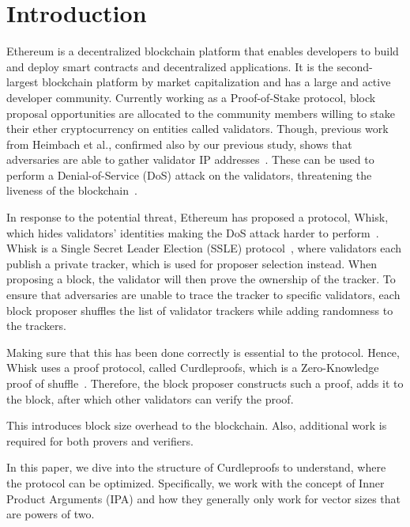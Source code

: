 

\section{Introduction}\label{sec:introduction}
Ethereum is a decentralized blockchain platform that enables developers to build and deploy smart contracts and decentralized applications.
It is the second-largest blockchain platform by market capitalization and has a large and active developer community.
Currently working as a Proof-of-Stake protocol, block proposal opportunities are allocated to the community members willing to stake their ether cryptocurrency on entities called validators.
Though, previous work from Heimbach et al., confirmed also by our previous study, shows that adversaries are able to gather validator IP addresses~\cite{heimbach2024deanonymizingethereumvalidatorsp2p,ouroldpaper}.
These can be used to perform a Denial-of-Service (DoS) attack on the validators, threatening the liveness of the blockchain~\cite{EthereumAttackDefense2024,ouroldpaper}.

In response to the potential threat, Ethereum has proposed a protocol, Whisk, which hides validators' identities making the DoS attack harder to perform~\cite{Whisk2024}.
Whisk is a Single Secret Leader Election (SSLE) protocol~\cite{10.1145/3419614.3423258}, where validators each publish a private tracker, which is used for proposer selection instead.
When proposing a block, the validator will then prove the ownership of the tracker.
To ensure that adversaries are unable to trace the tracker to specific validators, each block proposer shuffles the list of validator trackers while adding randomness to the trackers.

Making sure that this has been done correctly is essential to the protocol.
Hence, Whisk uses a proof protocol, called Curdleproofs, which is a Zero-Knowledge proof of shuffle~\cite{Curdleproofs}.
Therefore, the block proposer constructs such a proof, adds it to the block, after which other validators can verify the proof.

This introduces block size overhead to the blockchain.
Also, additional work is required for both provers and verifiers.

In this paper, we dive into the structure of Curdleproofs to understand, where the protocol can be optimized.
Specifically, we work with the concept of Inner Product Arguments (IPA) and how they generally only work for vector sizes that are powers of two.

